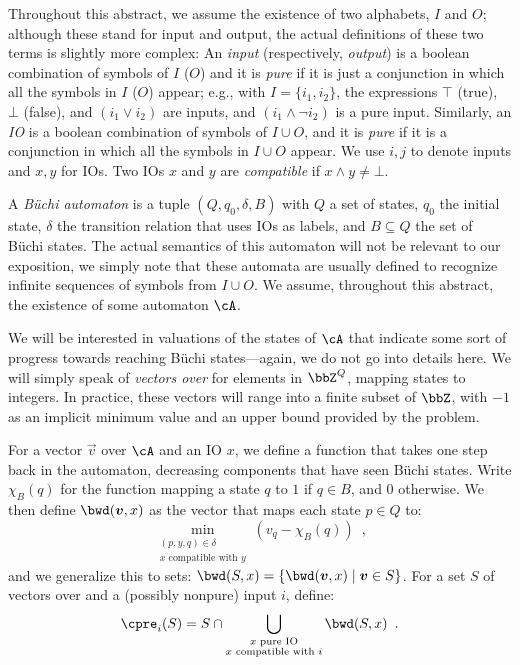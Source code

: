 \documentclass[runningheads,a4paper,draft]{llncs}
\begin{document}
Throughout this abstract, we assume the existence of two alphabets, \(I\) and
\(O\); although these stand for input and output, the actual definitions of
these two terms is slightly more complex: An \emph{input} (respectively,
\emph{output}) is a boolean
combination of symbols of \(I\) ($O$) and it is \emph{pure} if it is just a
conjunction in which all the symbols in \(I\) ($O$) appear; e.g., with \(I = \{i_1,
i_2\}\), the expressions \(\top\) (true), \(\bot\) (false), and \((i_1 \lor
i_2)\) are inputs, and \((i_1 \land \neg i_2)\) is a pure input. Similarly,
an \emph{IO} is a boolean combination of symbols of \(I \cup O\), and it is
\emph{pure} if it is a conjunction in which all the symbols in \(I \cup O\)
appear.  We use \(i, j\) to denote inputs and \(x, y\) for IOs.  Two IOs \(x\)
and \(y\) are \emph{compatible} if \(x \land y \neq \bot\).

A \emph{Büchi automaton} \cA is a tuple \((Q, q_0, \delta, B)\) with \(Q\) a set of
states, \(q_0\) the initial state, \(\delta\) the transition relation that uses IOs as
labels, and \(B \subseteq Q\) the set of Büchi states.  The actual semantics of this
automaton will not be relevant to our exposition, we simply note that these
automata are usually defined to recognize infinite sequences of symbols from
\(I \cup O\).  We assume, throughout this abstract, the existence of some automaton
\(\cA\).

We will be interested in valuations of the states of \(\cA\) that indicate some
sort of progress towards reaching Büchi states---again, we do not go into details
here.  We will simply speak of \emph{vectors over \cA} for elements in
\(\bbZ^Q\), mapping states to integers.  In practice, these vectors will range
into a finite subset of \(\bbZ\), with \(-1\) as an implicit minimum value and an
upper bound provided by the problem.

For a vector \(\vec{v}\) over \(\cA\) and an IO \(x\), we define a function that takes
one step back in the automaton, decreasing components that have seen Büchi
states.  Write \(\chi_B(q)\) for the function mapping a state \(q\) to \(1\) if \(q \in B\),
and \(0\) otherwise.  We then define \(\bwd(\vec{v}, x)\) as the vector that maps
each state \(p \in Q\) to:
\[\min_{\substack{(p, y, q) \in \delta\\ x \text{ compatible with } y}} \left(v_q -
  \chi_B(q)\right)\enspace,\]
and we generalize this to sets: \(\bwd(S, x) = \{\bwd(\vec{v}, x) \mid \vec{v}
\in S\}\).
%
For a set \(S\) of vectors over \cA and a (possibly nonpure) input \(i\), define:
\[\cpre_i(S) = S \cap \bigcup_{\substack{x \text{ pure IO}\\x \text{ compatible with } i}} \bwd(S, x)\enspace.\]
\end{document}
